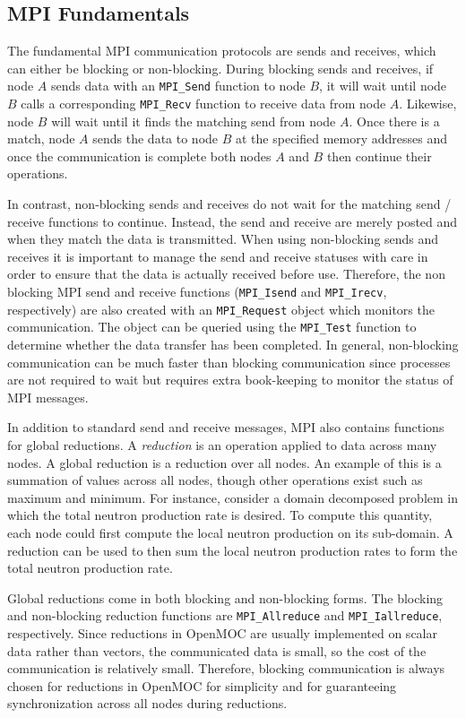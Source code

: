 \subsection{MPI Fundamentals}

The fundamental \ac{MPI} communication protocols are sends and receives, which can either be blocking or non-blocking. During blocking sends and receives, if node $A$ sends data with an \texttt{MPI_Send} function to node $B$, it will wait until node $B$ calls a corresponding \texttt{MPI_Recv} function to receive data from node $A$. Likewise, node $B$ will wait until it finds the matching send from node $A$. Once there is a match, node $A$ sends the data to node $B$ at the specified memory addresses and once the communication is complete both nodes $A$ and $B$ then continue their operations.

In contrast, non-blocking sends and receives do not wait for the matching send / receive functions to continue. Instead, the send and receive are merely posted and when they match the data is transmitted. When using non-blocking sends and receives it is important to manage the send and receive statuses with care in order to ensure that the data is actually received before use. Therefore, the non blocking \ac{MPI} send and receive functions (\texttt{MPI_Isend} and \texttt{MPI_Irecv}, respectively) are also created with an \texttt{MPI_Request} object which monitors the communication. The object can be queried using the \texttt{MPI_Test} function to determine whether the data transfer has been completed. In general, non-blocking communication can be much faster than blocking communication since processes are not required to wait but requires extra book-keeping to monitor the status of \ac{MPI} messages.

In addition to standard send and receive messages, \ac{MPI} also contains functions for global reductions. A \textit{reduction} is an operation applied to data across many nodes. A global reduction is a reduction over all nodes. An example of this is a summation of values across all nodes, though other operations exist such as maximum and minimum. For instance, consider a domain decomposed problem in which the total neutron production rate is desired. To compute this quantity, each node could first compute the local neutron production on its sub-domain. A reduction can be used to then sum the local neutron production rates to form the total neutron production rate.

Global reductions come in both blocking and non-blocking forms. The blocking and non-blocking reduction functions are \texttt{MPI_Allreduce} and \texttt{MPI_Iallreduce}, respectively. Since reductions in OpenMOC are usually implemented on scalar data rather than vectors, the communicated data is small, so the cost of the communication is relatively small. Therefore, blocking communication is always chosen for reductions in OpenMOC for simplicity and for guaranteeing synchronization across all nodes during reductions.

